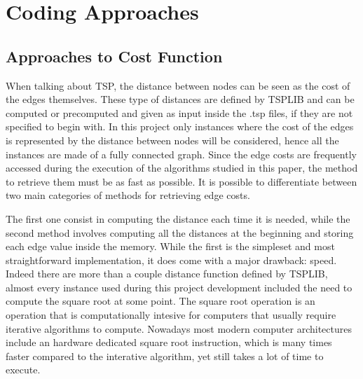 \chapter{Coding Approaches}

\section{Approaches to Cost Function}

When talking about TSP, the distance between nodes can be seen as the cost of the edges themselves.
These type of distances are defined by TSPLIB\cite{tsplib} and can be computed or precomputed and given as input inside the .tsp files, if they are not specified to begin with.
In this project only instances where the cost of the edges is represented by the distance between nodes will be considered, hence all the instances are made of a fully connected graph.
Since the edge costs are frequently accessed during the execution of the algorithms studied in this paper, the method to retrieve them must be as fast as possible.
It is possible to differentiate between two main categories of methods for retrieving edge costs.

The first one consist in computing the distance each time it is needed, while the second method involves computing all the distances at the beginning and storing each edge value inside the memory.
While the first is the simpleset and most straightforward implementation, it does come with a major drawback: speed.
Indeed there are more than a couple distance function defined by TSPLIB, almost every instance used during this project development included the need to compute the square root at some point.
The square root operation is an operation that is computationally intesive for computers that usually require iterative algorithms to compute.
Nowadays most modern computer architectures include an hardware dedicated square root instruction, which is many times faster compared to the interative algorithm, yet still takes a lot of time to execute.

